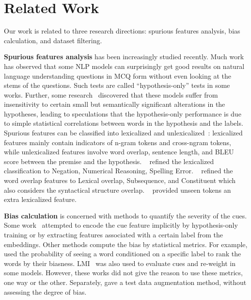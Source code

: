 \section{Related Work}
\label{sec:related}

Our work is related to 
three research directions: spurious features analysis, 
bias calculation, and dataset filtering. 
 
\textbf{Spurious features analysis} has been increasingly studied recently. 
Much work~\cite{sharma2018tackling,srinivasan2018simple,zellers2018swag} 
has observed that some NLP models can surprisingly 
get good results on natural language understanding questions in MCQ form without 
even looking at the stems of the questions. Such tests are called
``hypothesis-only'' tests in some works.
Further, some research~\cite{sanchez2018behavior} discovered that these models 
suffer from insensitivity to certain small but semantically significant alterations
in the hypotheses, leading to speculations that the hypothesis-only performance
is due to simple statistical correlations between words in the hypothesis 
and the labels. 
Spurious features can be classified into
lexicalized and unlexicalized~\cite{bowman2015large}:
lexicalized features mainly contain indicators of n-gram tokens and cross-ngram tokens, 
while unlexicalized features involve word overlap, sentence length, and BLEU score between 
the premise and the hypothesis. ~\cite{naik2018stress} refined the 
lexicalized classification to Negation, Numerical Reasoning, 
Spelling Error. ~\cite{mccoy2019right} refined the word overlap 
features to Lexical overlap, Subsequence, and Constituent 
which also considers the syntactical structure overlap. ~\cite{sanchez2018behavior} 
provided unseen tokens an extra lexicalized feature. 

\textbf{Bias calculation} is concerned with methods to quantify the severity of the cues. 
Some work~\cite{clark2019don,he2019unlearn,yaghoobzadeh2019robust} 
attempted to encode the cue feature implicitly by 
hypothesis-only training or by extracting features associated with a certain label 
from the embeddings. 
Other methods compute the bias by statistical metrics. 
For example, \cite{yu2020reclor} used the probability of seeing a word 
conditioned on a specific label to rank the words by their biasness. 
LMI~\cite{schuster2019towards} was also used to evaluate cues and 
re-weight in some models. 
However, these works did not give the reason to use these metrics, one way or 
the other.
Separately, \cite{Marco2020acl} gave a test data augmentation method, 
without assessing the degree of bias.

